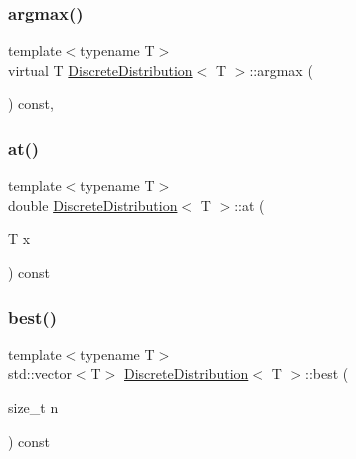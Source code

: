\subsubsection{\texorpdfstring{argmax()}{argmax()}}
{\footnotesize\ttfamily template$<$typename T$>$ \\
virtual T \hyperlink{class_discrete_distribution}{Discrete\+Distribution}$<$ T $>$\+::argmax (\begin{DoxyParamCaption}{ }\end{DoxyParamCaption}) const\hspace{0.3cm}{\ttfamily [inline]}, {\ttfamily [virtual]}}

\mbox{\label{class_discrete_distribution_acb11f1cfbf4ef039c538f06cde8249fd}} 
\subsubsection{\texorpdfstring{at()}{at()}}
{\footnotesize\ttfamily template$<$typename T$>$ \\
double \hyperlink{class_discrete_distribution}{Discrete\+Distribution}$<$ T $>$\+::at (\begin{DoxyParamCaption}\item[{T}]{x }\end{DoxyParamCaption}) const\hspace{0.3cm}{\ttfamily [inline]}}

\mbox{\label{class_discrete_distribution_add71949e73131894f28a0fa9af3d2fc1}} 
\subsubsection{\texorpdfstring{best()}{best()}}
{\footnotesize\ttfamily template$<$typename T$>$ \\
std\+::vector$<$T$>$ \hyperlink{class_discrete_distribution}{Discrete\+Distribution}$<$ T $>$\+::best (\begin{DoxyParamCaption}\item[{size\+\_\+t}]{n }\end{DoxyParamCaption}) const\hspace{0.3cm}{\ttfamily [inline]}}


